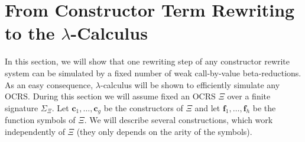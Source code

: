 \documentclass{LMCS}
\newcommand{\funone}{\mathbf{f}}
\newcommand{\conone}{\mathbf{c}}
\newcommand{\Functions}[1]{\Sigma_{#1}}
\newcommand{\TRSone}{\Xi}
\newcounter{number}
\begin{document}
\section{From Constructor Term Rewriting to the $\lambda$-Calculus}\label{Sect:CTR2L}
In this section, we will show that one rewriting step of any constructor rewrite
system can be simulated by a fixed number of weak call-by-value beta-reductions. As 
an easy consequence, $\lambda$-calculus will be shown to efficiently simulate any
OCRS. During this section we will assume fixed an  OCRS $\TRSone$  over a finite signature $\Functions{\TRSone}$. Let
$\conone_1,\ldots,\conone_g$ be the constructors of $\TRSone$
and let $\funone_1,\ldots,\funone_h$ be the function symbols of
$\TRSone$. We will describe several constructions, which work independently of $\TRSone$ (they only depends on the arity of the symbols).
\end{document}
